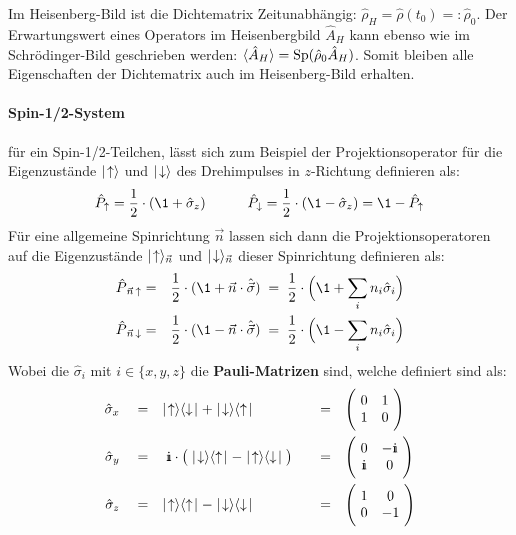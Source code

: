 Im Heisenberg-Bild ist die Dichtematrix Zeitunabhängig: $\hat{\rho}_H=\hat{\rho}(t_0)=:\hat{\rho}_0$. Der Erwartungswert eines Operators im Heisenbergbild $\hat{A}_H$ kann ebenso wie im Schrödinger-Bild geschrieben werden: $\langle\!\!\,\,\hat{A}_H\!\!\,\,\rangle=\text{Sp}(\hat{\rho}_0\hat{A}_H)$. Somit bleiben alle Eigenschaften der Dichtematrix auch im Heisenberg-Bild erhalten. 


\paragraph{Spin-1/2-System}

für ein Spin-1/2-Teilchen, lässt sich zum Beispiel der Projektionsoperator für die Eigenzustände $\mid\!\!\!\,\,{\uparrow}\rangle$ und $\mid\!\!\!\,\,{\downarrow}\rangle$ des Drehimpulses in $z$-Richtung definieren als:
\begin{eqnarray*}
	\hat{P}_{\uparrow} = \frac12\cdot(\1+\hat{\sigma}_z) &\qquad& \hat{P}_{\downarrow} = \frac12\cdot(\1-\hat{\sigma}_z) = \1-\hat{P}_{\uparrow}
\end{eqnarray*}
Für eine allgemeine Spinrichtung $\vec{n}$ lassen sich dann die Projektionsoperatoren auf die Eigenzustände $\mid\!\!\!\,\,{\uparrow}\rangle_{\vec{n}}$ und $\mid\!\!\!\,\,{\downarrow}\rangle_{\vec{n}}$ dieser Spinrichtung definieren als: 
\begin{eqnarray*}
	\hat{P}_{\,\vec{n}\,\uparrow} &=& \frac12\cdot (\1+\vec{n}\cdot\hat{\vec{\sigma}}) \;=\; \frac12\cdot\Big(\1+\sum_i n_i\hat{\sigma}_i\Big)
	\\
	\hat{P}_{\,\vec{n}\,\downarrow} &=& \frac12\cdot (\1-\vec{n}\cdot\hat{\vec{\sigma}}) \;=\; \frac12\cdot\Big(\1-\sum_i n_i\hat{\sigma}_i\Big)
\end{eqnarray*}
Wobei die $\hat{\sigma}_i$ mit $i\in\{x,y,z\}$ die {\bf Pauli-Matrizen} sind, welche definiert sind als: 
\begin{alignat*}{3}
	\hat{\sigma}_x &\quad=\quad \up\downdg+\down\updg &\quad=\quad& \Bigg(\!\begin{array}{cc} 0 & 1 \\ 1 & 0 \end{array}\!\Bigg)
	\\
	\hat{\sigma}_y &\quad=\quad \I\cdot\big(\down\updg-\up\downdg\big) &\quad=\quad&\Bigg(\!\begin{array}{cc} 0 & -\I \\ \I & 0 \end{array}\!\Bigg)
	\\
	\hat{\sigma}_z &\quad=\quad \up\updg-\down\downdg &\quad=\quad&\Bigg(\!\begin{array}{cc} 1 & 0 \\ 0 & -1 \end{array}\!\Bigg)
\end{alignat*}
